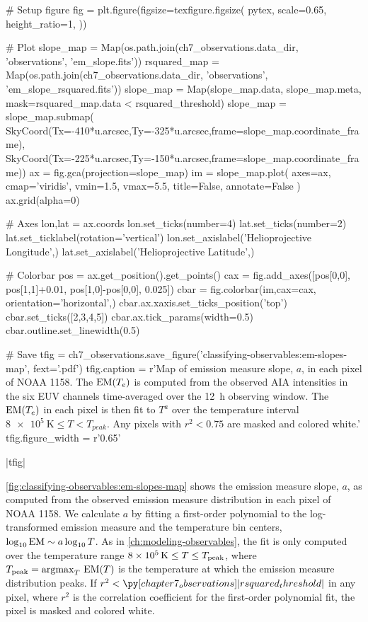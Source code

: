 \begin{pycode}
# Setup figure
fig = plt.figure(figsize=texfigure.figsize(
    pytex,
    scale=0.65,
    height_ratio=1,
))

# Plot
slope_map = Map(os.path.join(ch7_observations.data_dir, 'observations', 'em_slope.fits'))
rsquared_map = Map(os.path.join(ch7_observations.data_dir, 'observations', 'em_slope_rsquared.fits'))
slope_map = Map(slope_map.data, slope_map.meta, mask=rsquared_map.data < rsquared_threshold)
slope_map = slope_map.submap(
    SkyCoord(Tx=-410*u.arcsec,Ty=-325*u.arcsec,frame=slope_map.coordinate_frame),
    SkyCoord(Tx=-225*u.arcsec,Ty=-150*u.arcsec,frame=slope_map.coordinate_frame))
ax = fig.gca(projection=slope_map)
im = slope_map.plot(
    axes=ax,
    cmap='viridis',
    vmin=1.5,
    vmax=5.5,
    title=False,
    annotate=False
)
ax.grid(alpha=0)

# Axes
lon,lat = ax.coords
lon.set_ticks(number=4)
lat.set_ticks(number=2)
lat.set_ticklabel(rotation='vertical')
lon.set_axislabel('Helioprojective Longitude',)
lat.set_axislabel('Helioprojective Latitude',)

# Colorbar
pos = ax.get_position().get_points()
cax = fig.add_axes([pos[0,0], pos[1,1]+0.01, pos[1,0]-pos[0,0], 0.025])
cbar = fig.colorbar(im,cax=cax, orientation='horizontal',)
cbar.ax.xaxis.set_ticks_position('top')
cbar.set_ticks([2,3,4,5])
cbar.ax.tick_params(width=0.5)
cbar.outline.set_linewidth(0.5)

# Save
tfig = ch7_observations.save_figure('classifying-observables:em-slopes-map', fext='.pdf')
tfig.caption = r'Map of emission measure slope, $a$, in each pixel of \AR{} NOAA 1158. The $\textup{EM}(T_e)$ is computed from the observed AIA intensities in the six EUV channels time-averaged over the \SI{12}{\hour} observing window. The $\textup{EM}(T_e)$ in each pixel is then fit to $T^a$ over the temperature interval $\SI{8e5}{\kelvin}\le T < T_{peak}$. Any pixels with $r^2<0.75$ are masked and colored white.'
tfig.figure_width = r'0.65\textwidth'
\end{pycode}
|tfig|

\autoref{fig:classifying-observables:em-slopes-map} shows the emission measure slope, $a$, as computed from the observed emission measure distribution in each pixel of \AR{} NOAA 1158. We calculate $a$ by fitting a first-order polynomial to the log-transformed emission measure and the temperature bin centers, $\log_{10}\textup{EM}\sim a\log_{10}T$. As in \autoref{ch:modeling-observables}, the fit is only computed over the temperature range $\SI{8e5}{\kelvin}\le T \le T_\textup{peak}$, where $T_\textup{peak}=\operatorname*{argmax}_T\,\textup{EM}(T)$ is the temperature at which the emission measure distribution peaks. If $r^2<\py[chapter7_observations]|rsquared_threshold|$ in any pixel, where $r^2$ is the correlation coefficient for the first-order polynomial fit, the pixel is masked and colored white. 

